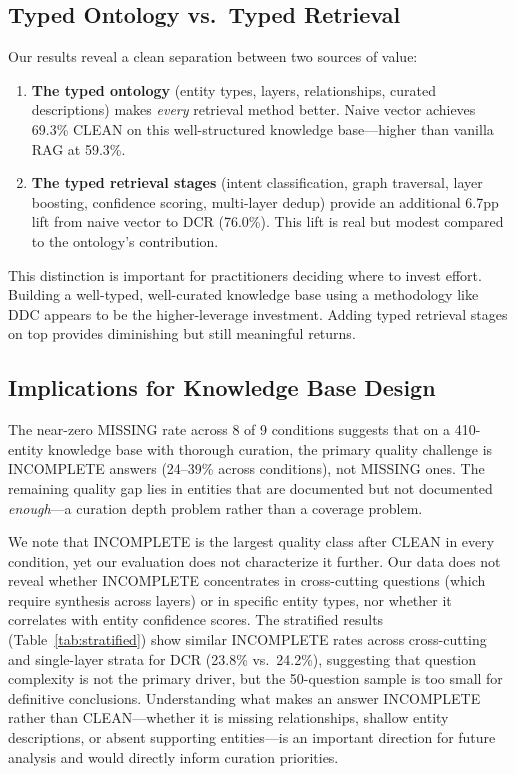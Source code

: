 \documentclass[11pt,a4paper]{article}
\begin{document}
\subsection{Typed Ontology vs.\ Typed Retrieval}

Our results reveal a clean separation between two sources of value:

\begin{enumerate}[nosep]
  \item \textbf{The typed ontology} (entity types, layers, relationships, curated descriptions) makes \emph{every} retrieval method better. Naive vector achieves 69.3\% CLEAN on this well-structured knowledge base---higher than vanilla RAG at 59.3\%.
  \item \textbf{The typed retrieval stages} (intent classification, graph traversal, layer boosting, confidence scoring, multi-layer dedup) provide an additional 6.7pp lift from naive vector to DCR (76.0\%). This lift is real but modest compared to the ontology's contribution.
\end{enumerate}

This distinction is important for practitioners deciding where to invest effort. Building a well-typed, well-curated knowledge base using a methodology like DDC appears to be the higher-leverage investment. Adding typed retrieval stages on top provides diminishing but still meaningful returns.

\subsection{Implications for Knowledge Base Design}

The near-zero MISSING rate across 8 of 9 conditions suggests that on a 410-entity knowledge base with thorough curation, the primary quality challenge is INCOMPLETE answers (24--39\% across conditions), not MISSING ones. The remaining quality gap lies in entities that are documented but not documented \emph{enough}---a curation depth problem rather than a coverage problem.

We note that INCOMPLETE is the largest quality class after CLEAN in every condition, yet our evaluation does not characterize it further. Our data does not reveal whether INCOMPLETE concentrates in cross-cutting questions (which require synthesis across layers) or in specific entity types, nor whether it correlates with entity confidence scores. The stratified results (Table~\ref{tab:stratified}) show similar INCOMPLETE rates across cross-cutting and single-layer strata for DCR (23.8\% vs.\ 24.2\%), suggesting that question complexity is not the primary driver, but the 50-question sample is too small for definitive conclusions. Understanding what makes an answer INCOMPLETE rather than CLEAN---whether it is missing relationships, shallow entity descriptions, or absent supporting entities---is an important direction for future analysis and would directly inform curation priorities.
\end{document}
